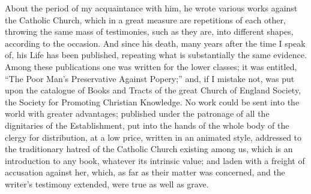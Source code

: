 About the period of my acquaintance with him, he wrote
various works against the Catholic Church, which in a
great measure are repetitions of each other, throwing the
same mass of testimonies, such as they are, into
different shapes, according to the occasion. And since
his death, many years after the time I speak of, his Life
has been published, repeating what is substantially the
same evidence. Among these publications one was written
for the lower classes; it was entitled, ``The Poor
Man's Preservative Against Popery;'' and, if I
mistake not, was put upon the catalogue of Books and
Tracts of the great Church of England Society, the
Society for Promoting Christian Knowledge. No work could
be sent into the world with greater advantages; published
under the patronage of all the dignitaries of the
Establishment, put into the hands of the whole body of
the clergy for distribution, at a low price, written in
an animated style, addressed to the traditionary hatred
of the Catholic Church existing among us, which is an
introduction to any book, whatever its intrinsic value;
and laden with a freight of accusation against her,
which, as far as their matter was concerned, and the
writer's testimony extended, were true as well as grave.

